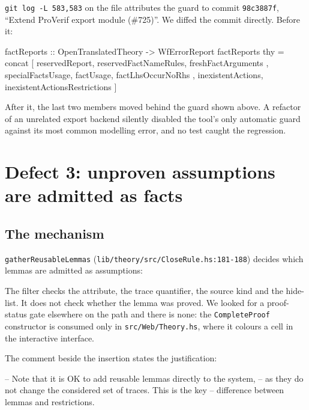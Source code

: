 \documentclass[version=preprint]{iacrcc}
\newcommand{\code}[1]{\texttt{\small #1}}
\theoremstyle{definition}
\theoremstyle{remark}
\begin{document}
	\code{git log -L 583,583} on the file attributes the guard to commit
	\code{98c3887f}, ``Extend ProVerif export module (\#725)''. We diffed the
	commit directly. Before it:

	\begin{hslisting}
		factReports :: OpenTranslatedTheory -> WfErrorReport
		factReports thy = concat
			[ reservedReport, reservedFactNameRules, freshFactArguments
				, specialFactsUsage, factUsage, factLhsOccurNoRhs
				, inexistentActions, inexistentActionsRestrictions ]
	\end{hslisting}

	After it, the last two members moved behind the guard shown above. A refactor
	of an unrelated export backend silently disabled the tool's only automatic
	guard against its most common modelling error, and no test caught the
	regression.

	\section{Defect 3: unproven assumptions are admitted as facts}\label{sec:reuse}

	\subsection{The mechanism}

	\code{gatherReusableLemmas} (\code{lib/theory/src/CloseRule.hs:181-188}) decides
	which lemmas are admitted as assumptions:


The filter checks the attribute, the trace quantifier, the source kind and the
hide-list. It does not check whether the lemma was proved. We looked for a
proof-status gate elsewhere on the path and there is none: the
\code{CompleteProof} constructor is consumed only in \code{src/Web/Theory.hs},
where it colours a cell in the interactive interface.

The comment beside the insertion states the justification:

\begin{hslisting}
	-- Note that it is OK to add reusable lemmas directly to the system,
	-- as they do not change the considered set of traces. This is the key
	-- difference between lemmas and restrictions.
\end{hslisting}
\end{document}
